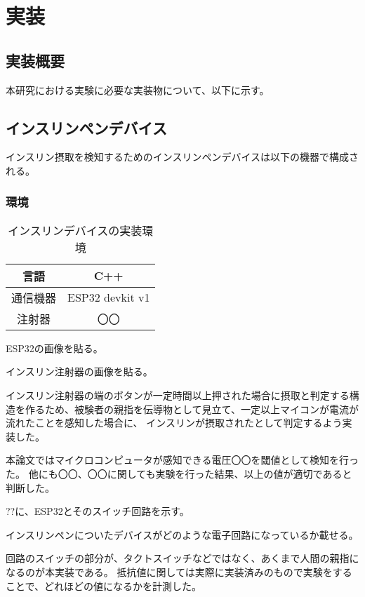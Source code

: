 \chapter{実装}
\label{chap:implementation}

\section{実装概要}
本研究における実験に必要な実装物について、以下に示す。

\section{インスリンペンデバイス}

インスリン摂取を検知するためのインスリンペンデバイスは以下の機器で構成される。

\subsection{環境}

\begin{table}[htbp]
  \caption{インスリンデバイスの実装環境}
  \label{tb:insulin-device}
  \begin{center}
    \begin{tabular}{c||c}
      \hline
      言語  & C++ \\\hline
      通信機器  & ESP32 devkit v1 \\\hline
      注射器 & 〇〇 \\\hline
    \end{tabular}
  \end{center}
\end{table}

ESP32の画像を貼る。

インスリン注射器の画像を貼る。

インスリン注射器の端のボタンが一定時間以上押された場合に摂取と判定する構造を作るため、被験者の親指を伝導物として見立て、一定以上マイコンが電流が流れたことを感知した場合に、
インスリンが摂取されたとして判定するよう実装した。

本論文ではマイクロコンピュータが感知できる電圧〇〇を閾値として検知を行った。
他にも〇〇、〇〇に関しても実験を行った結果、以上の値が適切であると判断した。

??に、ESP32とそのスイッチ回路を示す。

インスリンペンについたデバイスがどのような電子回路になっているか載せる。

回路のスイッチの部分が、タクトスイッチなどではなく、あくまで人間の親指になるのが本実装である。
抵抗値に関しては実際に実装済みのもので実験をすることで、どれほどの値になるかを計測した。


